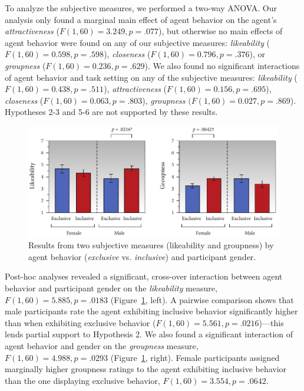 To analyze the subjective measures, we performed a two-way ANOVA. Our analysis only found a marginal main effect of agent behavior on the agent's \emph{attractiveness} ($F(1, 60) = 3.249, p = .077$), but otherwise no main effects of agent behavior were found on any of our subjective measures: \emph{likeability} ($F(1, 60) = 0.598, p = .598$), \emph{closeness} ($F(1, 60) = 0.796, p = .376$), or \emph{groupness} ($F(1, 60) = 0.236, p = .629$). We also found no significant interactions of agent behavior and task setting on any of the subjective measures: \emph{likeability} ($F(1, 60) = 0.438, p = .511$), \emph{attractiveness} ($F(1, 60) = 0.156, p = .695$), \emph{closeness} ($F(1, 60) = 0.063, p = .803$), \emph{groupness} $(F(1, 60) = 0.027, p = .869$). Hypotheses 2-3 and 5-6 are not supported by these results.

\begin{figure}
\centering
\includegraphics[width=1\textwidth]{conversationalrolegaze/Figures/ResultsSubjectiveGender.pdf}
\caption{Results from two subjective measures (likeability and groupness) by agent behavior (\emph{exclusive} vs. \emph{inclusive}) and participant gender.}
\label{fig:GazeFootingSubjectiveGender}
\end{figure}

Post-hoc analyses revealed a significant, cross-over interaction between agent behavior and participant gender on the \emph{likeability} measure, $F(1, 60) = 5.885, p = .0183$ (Figure~\ref{fig:GazeFootingSubjectiveGender}, left). A pairwise comparison shows that male participants rate the agent exhibiting inclusive behavior significantly higher than when exhibiting exclusive behavior ($F(1, 60) = 5.561, p = .0216$)---this lends partial support to Hypothesis 2. We also found a significant interaction of agent behavior and gender on the \emph{groupness} measure, $F(1, 60) = 4.988, p = .0293$ (Figure~\ref{fig:GazeFootingSubjectiveGender}, right). Female participants assigned marginally higher groupness ratings to the agent exhibiting inclusive behavior than the one displaying exclusive behavior, $F(1, 60) = 3.554, p = .0642$.

